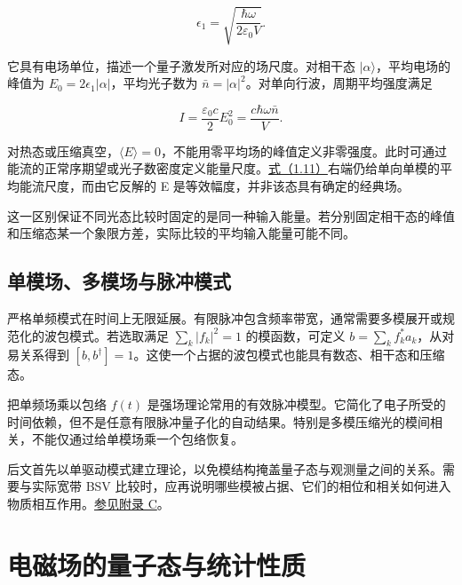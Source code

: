 \documentclass[UTF8,a4paper,zihao=-4,openany,fontset=fandol]{ctexbook}
\begin{document}
\begin{equation*}
\epsilon_1=\sqrt{\frac{\hbar\omega}{2\varepsilon_0V}}.
\tag{1.10}\label{eq:1.10}
\end{equation*}


它具有电场单位，描述一个量子激发所对应的场尺度。对相干态 $|\alpha\rangle$，平均电场的峰值为 $E_0=2\epsilon_1|\alpha|$，平均光子数为 $\bar n=|\alpha|^2$。对单向行波，周期平均强度满足



\begin{equation*}
I=\frac{\varepsilon_0c}{2}E_0^2
=\frac{c\hbar\omega\bar n}{V}.
\tag{1.11}\label{eq:1.11}
\end{equation*}


对热态或压缩真空，$\langle E\rangle=0$，不能用零平均场的峰值定义非零强度。此时可通过能流的正常序期望或光子数密度定义能量尺度。\hyperref[eq:1.11]{式（1.11）}右端仍给单向单模的平均能流尺度，而由它反解的 E 是等效幅度，并非该态具有确定的经典场。



这一区别保证不同光态比较时固定的是同一种输入能量。若分别固定相干态的峰值和压缩态某一个象限方差，实际比较的平均输入能量可能不同。



\section{单模场、多模场与脉冲模式}\label{sec:01:8}


严格单频模式在时间上无限延展。有限脉冲包含频率带宽，通常需要多模展开或规范化的波包模式。若选取满足 $\sum_k|f_k|^2=1$ 的模函数，可定义 $b=\sum_kf_k^*a_k$，从对易关系得到 $[b,b^\dagger]=1$。这使一个占据的波包模式也能具有数态、相干态和压缩态。



把单频场乘以包络 $f(t)$ 是强场理论常用的有效脉冲模型。它简化了电子所受的时间依赖，但不是任意有限脉冲量子化的自动结果。特别是多模压缩光的模间相关，不能仅通过给单模场乘一个包络恢复。



后文首先以单驱动模式建立理论，以免模结构掩盖量子态与观测量之间的关系。需要与实际宽带 BSV 比较时，应再说明哪些模被占据、它们的相位和相关如何进入物质相互作用。\hyperref[ch:C]{参见附录 C}。



\chapter{电磁场的量子态与统计性质}\label{ch:02}
\end{document}
